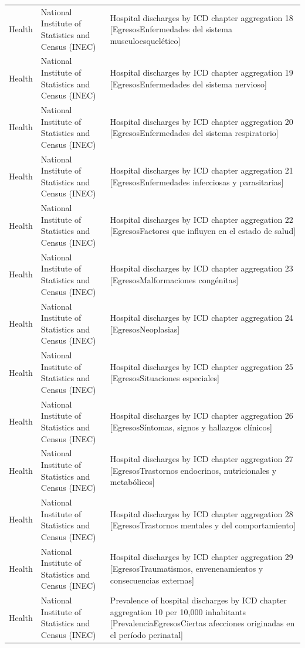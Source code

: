 \documentclass[10pt,a4paper]{article}
\begin{document}
\begin{longtable}{@{}>{\raggedright\arraybackslash}p{3.5cm}>{\raggedright\arraybackslash}p{5.6cm}>{\raggedright\arraybackslash}p{\dimexpr\textwidth-9.1cm-4\tabcolsep\relax}@{}}
Health & National Institute of Statistics and Census (INEC) & Hospital discharges by ICD chapter aggregation 18 [EgresosEnfermedades del sistema musculoesquel\'{e}tico]\\
Health & National Institute of Statistics and Census (INEC) & Hospital discharges by ICD chapter aggregation 19 [EgresosEnfermedades del sistema nervioso]\\
Health & National Institute of Statistics and Census (INEC) & Hospital discharges by ICD chapter aggregation 20 [EgresosEnfermedades del sistema respiratorio]\\
Health & National Institute of Statistics and Census (INEC) & Hospital discharges by ICD chapter aggregation 21 [EgresosEnfermedades infecciosas y parasitarias]\\
Health & National Institute of Statistics and Census (INEC) & Hospital discharges by ICD chapter aggregation 22 [EgresosFactores que influyen en el estado de salud]\\
Health & National Institute of Statistics and Census (INEC) & Hospital discharges by ICD chapter aggregation 23 [EgresosMalformaciones cong\'{e}nitas]\\
Health & National Institute of Statistics and Census (INEC) & Hospital discharges by ICD chapter aggregation 24 [EgresosNeoplasias]\\
Health & National Institute of Statistics and Census (INEC) & Hospital discharges by ICD chapter aggregation 25 [EgresosSituaciones especiales]\\
Health & National Institute of Statistics and Census (INEC) & Hospital discharges by ICD chapter aggregation 26 [EgresosS\'{i}ntomas, signos y hallazgos cl\'{i}nicos]\\
Health & National Institute of Statistics and Census (INEC) & Hospital discharges by ICD chapter aggregation 27 [EgresosTrastornos endocrinos, nutricionales y metab\'{o}licos]\\
Health & National Institute of Statistics and Census (INEC) & Hospital discharges by ICD chapter aggregation 28 [EgresosTrastornos mentales y del comportamiento]\\
Health & National Institute of Statistics and Census (INEC) & Hospital discharges by ICD chapter aggregation 29 [EgresosTraumatismos, envenenamientos y consecuencias externas]\\
Health & National Institute of Statistics and Census (INEC) & Prevalence of hospital discharges by ICD chapter aggregation 10 per 10,000 inhabitants [PrevalenciaEgresosCiertas afecciones originadas en el per\'{i}odo perinatal]\\

\end{longtable}
\end{document}
